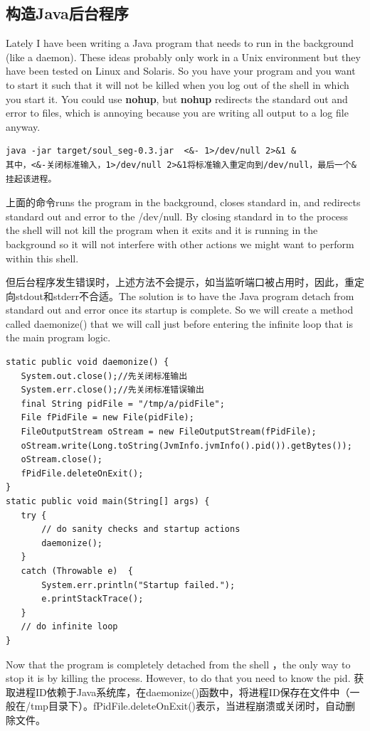 \subsection{构造Java后台程序}
\par Lately I have been writing a Java program that needs to run in the background (like a daemon). These ideas probably only work in a Unix environment but they have been tested on Linux and Solaris. So you have your program and you want to start it such that it will not be killed when you log out of the shell in which you start it. You could use \textbf{nohup}, but \textbf{nohup} redirects the standard out and error to files, which is annoying because you are writing all output to a log file anyway. 
\begin{verbatim}
java -jar target/soul_seg-0.3.jar  <&- 1>/dev/null 2>&1 &
其中，<&-关闭标准输入，1>/dev/null 2>&1将标准输入重定向到/dev/null，最后一个&挂起该进程。
\end{verbatim}
\par 上面的命令runs the program in the background, closes standard in, and redirects standard out and error to the /dev/null. By closing standard in to the process the shell will not kill the program when it exits and it is running in the background so it will not interfere with other actions we might want to perform within this shell.
\par 但后台程序发生错误时，上述方法不会提示，如当监听端口被占用时，因此，重定向stdout和stderr不合适。The solution is to have the Java program detach from standard out and error once its startup is complete. So we will create a method called daemonize() that we will call just before entering the infinite loop that is the main program logic.
\begin{verbatim}
static public void daemonize() {
   System.out.close();//先关闭标准输出
   System.err.close();//先关闭标准错误输出
   final String pidFile = "/tmp/a/pidFile";
   File fPidFile = new File(pidFile);
   FileOutputStream oStream = new FileOutputStream(fPidFile);
   oStream.write(Long.toString(JvmInfo.jvmInfo().pid()).getBytes());
   oStream.close();
   fPidFile.deleteOnExit();
}
static public void main(String[] args) {
   try {
       // do sanity checks and startup actions
       daemonize();
   }
   catch (Throwable e)  {
       System.err.println("Startup failed.");
       e.printStackTrace();
   }
   // do infinite loop
}
\end{verbatim}
\par Now that the program is completely detached from the shell ，the only way to stop it is by killing the process. However, to do that you need to know the pid. 获取进程ID依赖于Java系统库，在daemonize()函数中，将进程ID保存在文件中（一般在/tmp目录下）。fPidFile.deleteOnExit()表示，当进程崩溃或关闭时，自动删除文件。

